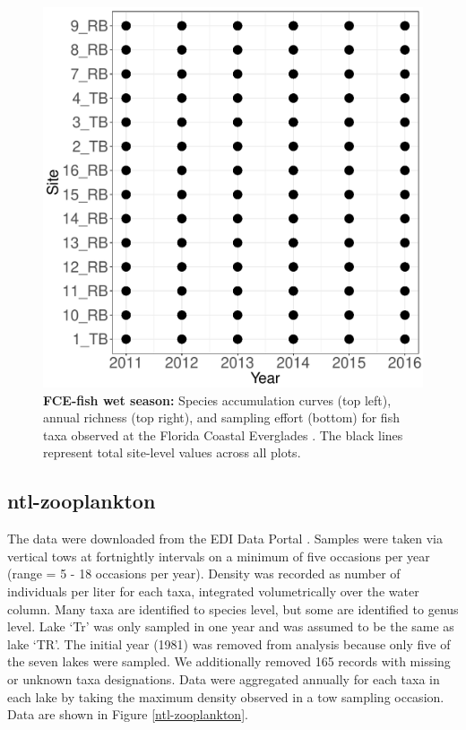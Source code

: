 \documentclass[11pt, oneside]{article}
\begin{document}
\begin{figure}[h!]
\includegraphics[scale = 0.4]{fce-fish-RehageWet_spatiotemporal_sampling_effort.pdf}
\caption{{\bf FCE-fish wet season:} Species accumulation curves (top left),  annual richness (top right), and sampling effort (bottom)  for fish taxa observed at the Florida Coastal Everglades . The black lines represent total site-level values across all plots.}
\label{fce-fish-wet}
\end{figure}



\newpage
\subsection {ntl-zooplankton}
The data were downloaded from the EDI Data Portal \citep{ntl-zooplankton}.
Samples were taken  via vertical tows at fortnightly intervals on a minimum of five occasions per year (range = 5 - 18 occasions per year).
Density was recorded as number of individuals per liter for each taxa, integrated volumetrically over the water column.
Many taxa are identified to species level, but some are identified to genus level.
Lake `Tr'  was only sampled in one year and was assumed to be the same as lake `TR'. %
The initial year (1981) was removed from analysis because only five of the seven lakes were sampled.
We additionally removed 165 records with missing or unknown taxa designations.
Data were aggregated annually for each taxa in each lake by taking the maximum density observed in a tow sampling occasion.
Data are shown in Figure \ref{ntl-zooplankton}.
\end{document}
